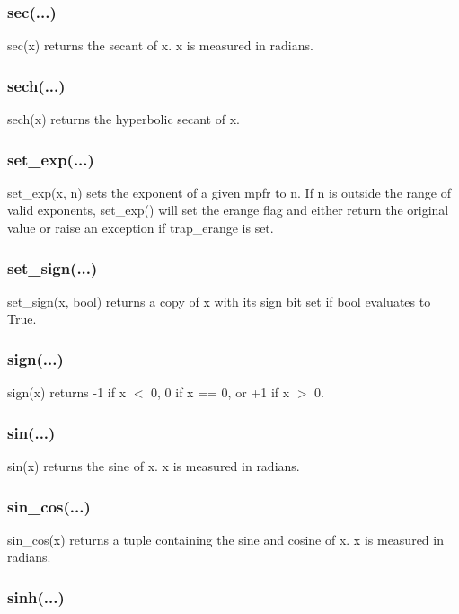 \subsubsection{sec(...)}

sec(x) returns the secant of x. x is measured in radians.

\subsubsection{sech(...)}

sech(x) returns the hyperbolic secant of x.

\subsubsection{set\_exp(...)}

set\_exp(x, n) sets the exponent of a given mpfr to n. If n is outside the range of valid
exponents, set\_exp() will set the erange flag and either return the original value or raise an
exception if trap\_erange is set.

\subsubsection{set\_sign(...)}

set\_sign(x, bool) returns a copy of x with its sign bit set if bool evaluates to True.

\subsubsection{sign(...)}

sign(x) returns -1 if x $<$ 0, 0 if x == 0, or +1 if x $>$ 0.

\subsubsection{sin(...)}

sin(x) returns the sine of x. x is measured in radians.

\subsubsection{sin\_cos(...)}

sin\_cos(x) returns a tuple containing the sine and cosine of x. x is measured in radians.

\subsubsection{sinh(...)}


